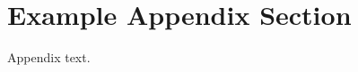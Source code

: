\documentclass[
  preprint, %
  3p, %
  times, %
  11pt, %
  authoryear %
]{elsarticle}
\begin{document}
\appendix
\section{Example Appendix Section}
\label{app1}

Appendix text.










\end{document}
